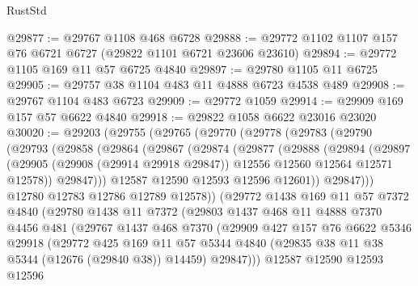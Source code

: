 \begin{lexlean}{RustStd}
\begin{coremodule}
@29877 := @29767 @1108 @468 @6728
@29888 := @29772 @1102 @1107 @157 @76 @6721 @6727 (@29822 @1101 @6721 @23606 @23610)
@29894 := @29772 @1105 @169 @11 @57 @6725 @4840
@29897 := @29780 @1105 @11 @6725
@29905 := @29757 @38 @1104 @483 @11 @4888 @6723 @4538 @489
@29908 := @29767 @1104 @483 @6723
@29909 := @29772 @1059
@29914 := @29909 @169 @157 @57 @6622 @4840
@29918 := @29822 @1058 @6622 @23016 @23020
@30020 := @29203
    (@29755
      (@29765
        (@29770
          (@29778
            (@29783
              (@29790
                (@29793
                  (@29858
                    (@29864
                      (@29867
                        (@29874
                          (@29877
                            (@29888
                              (@29894
                                (@29897
                                  (@29905
                                    (@29908 (@29914 @29918 @29847))
                                    @12556
                                    @12560
                                    @12564
                                    @12571
                                    @12578))
                                @29847)))
                          @12587
                          @12590
                          @12593
                          @12596
                          @12601))
                      @29847)))
                @12780
                @12783
                @12786
                @12789
                @12578))
            (@29772
              @1438
              @169
              @11
              @57
              @7372
              @4840
              (@29780
                @1438
                @11
                @7372
                (@29803
                  @1437
                  @468
                  @11
                  @4888
                  @7370
                  @4456
                  @481
                  (@29767
                    @1437
                    @468
                    @7370
                    (@29909
                      @427
                      @157
                      @76
                      @6622
                      @5346
                      @29918
                      (@29772
                        @425
                        @169
                        @11
                        @57
                        @5344
                        @4840
                        (@29835 @38 @11 @38 @5344 (@12676 (@29840 @38)) @14459)
                        @29847)))
                  @12587
                  @12590
                  @12593
                  @12596

\end{coremodule}
\end{lexlean}
